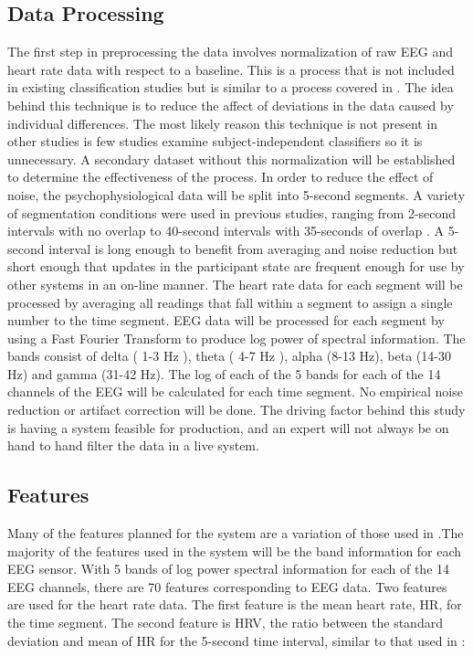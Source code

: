 \documentclass[11pt]{artikel3}
\begin{document}
\subsection{Data Processing}
The first step in preprocessing the data involves normalization of raw EEG and heart rate data with respect to a baseline. This is a process that is not included in existing classification studies but is similar to a process covered in \cite{Smith}. The idea behind this technique is to reduce the affect of deviations in the data caused by individual differences. The most likely reason this technique is not present in other studies is few studies examine subject-independent classifiers so it is unnecessary. A secondary dataset without this normalization will be established to determine the effectiveness of the process. In order to reduce the effect of noise, the psychophysiological data will be split into 5-second segments. A variety of segmentation conditions were used in previous studies, ranging from 2-second intervals with no overlap \cite{Smith} to 40-second intervals with 35-seconds of overlap \cite{Wang_Z}. A 5-second interval is long enough to benefit from averaging and noise reduction but short enough that updates in the participant state are frequent enough for use by other systems in an on-line manner. The heart rate data for each segment will be processed by averaging all readings that fall within a segment to assign a single number to the time segment. EEG data will be processed for each segment by using a Fast Fourier Transform to produce log power of spectral information. The bands consist of delta ( 1-3 Hz ), theta ( 4-7 Hz ), alpha (8-13 Hz), beta (14-30 Hz) and gamma (31-42 Hz). The log of each of the 5 bands for each of the 14 channels of the EEG will be calculated for each time segment. No empirical noise reduction or artifact correction will be done. The driving factor behind this study is having a system feasible for production, and an expert will not always be on hand to hand filter the data in a live system.


\subsection{Features}
Many of the features planned for the system are a variation of those used in \cite{Wilson}.The majority of the features used in the system will be the band information for each EEG sensor. With 5 bands of log power spectral information for each of the 14 EEG channels, there are 70 features corresponding to EEG data. Two features are used for the heart rate data. The first feature is the mean heart rate, HR, for the time segment. The second feature is HRV, the ratio between the standard deviation and mean of HR for the 5-second time interval, similar to that used in \cite{Zhang}: 
\end{document}
